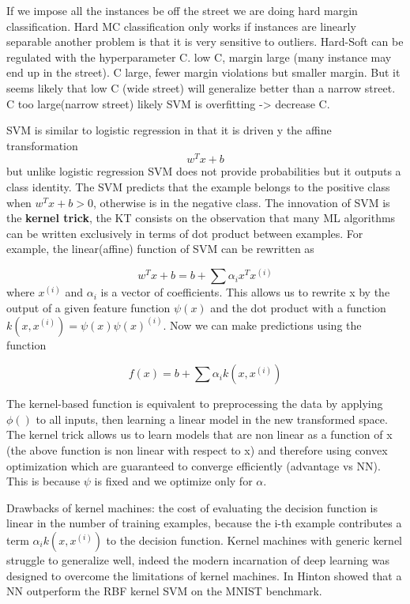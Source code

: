 \documentclass[9pt,twocolumn,twoside]{pnas-new}
\begin{document}
If we impose all the instances be off the street we are doing hard margin classification. Hard MC classification only works if instances are linearly separable another problem is that it is very sensitive to outliers.
Hard-Soft can be regulated with the hyperparameter C. low C, margin large (many instance may end up in the street). C large, fewer margin violations but smaller margin. But it seems likely that low C (wide street) will generalize better than a narrow street.
C too large(narrow street) likely SVM is overfitting -> decrease C.

SVM is similar to logistic regression in that it is driven y the affine transformation 
\begin{equation}
w^Tx + b
\end{equation}
but unlike logistic regression SVM does not provide probabilities but it outputs a class identity. The SVM predicts that the example belongs to the positive class when $w^Tx + b >0$, otherwise is in the negative class.
The innovation of SVM is the \textbf{kernel trick}, the KT consists on the observation that many ML algorithms can be written exclusively in terms of dot product between examples. For example, the linear(affine) function of SVM can be rewritten as

\begin{equation}
w^Tx + b = b + \sum \alpha_i x^T x^{(i)}
\end{equation}
where $x^{(i)}$ and $\alpha_i$ is a vector of coefficients. This allows us to rewrite x by the output of a given feature function $\psi(x)$ and the dot product with a function $k(x,x^{(i)}) = \psi(x)\psi(x)^{(i)}$.
Now we can make predictions using the function 

\begin{equation}
f(x) = b + \sum \alpha_i k(x, x^{(i)})
\end{equation}

The kernel-based function is equivalent to preprocessing the data by applying $\phi()$ to all inputs, then learning a linear model in the new transformed space. The kernel trick allows us to learn models that are non linear as a function of x (the above function is non linear with respect to x) and therefore using convex optimization which are guaranteed to converge efficiently (advantage vs NN). This is because $\psi$ is fixed and we optimize only for $\alpha$.

Drawbacks of kernel machines: the cost of evaluating the decision function is linear in the number of training examples, because the i-th example contributes a term $\alpha_i k(x, x^{(i)})$  to the decision function. Kernel machines with generic kernel struggle to generalize well, indeed the modern incarnation of deep learning was designed to overcome the  limitations of kernel machines. In \cite{hinton2006fast} Hinton showed that a NN outperform the RBF kernel SVM on the MNIST benchmark.
\end{document}
